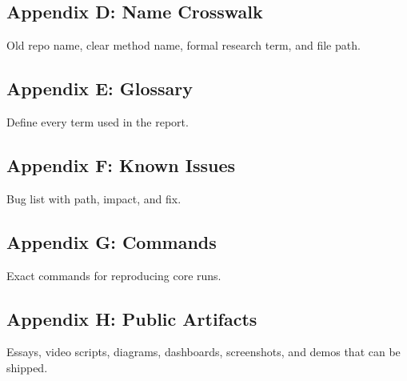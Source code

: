 \documentclass[11pt]{article}
\begin{document}
\subsection{Appendix D: Name Crosswalk}
Old repo name, clear method name, formal research term, and file path.

\subsection{Appendix E: Glossary}
Define every term used in the report.

\subsection{Appendix F: Known Issues}
Bug list with path, impact, and fix.

\subsection{Appendix G: Commands}
Exact commands for reproducing core runs.

\subsection{Appendix H: Public Artifacts}
Essays, video scripts, diagrams, dashboards, screenshots, and demos that can be shipped.
\end{document}
